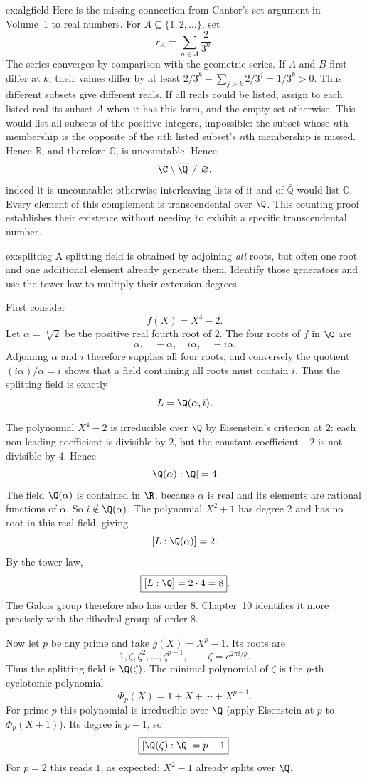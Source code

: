 \begin{solution}{ex:algfield}
Here is the missing connection from Cantor's set argument in Volume~1 to real
numbers. For $A\subseteq\{1,2,\ldots\}$, set
\[
r_A=\sum_{n\in A}\frac2{3^n}.
\]
The series converges by comparison with the geometric series. If $A$ and $B$
first differ at $k$, their values differ by at least
$2/3^k-\sum_{j>k}2/3^j=1/3^k>0$. Thus different subsets give different reals.
If all reals could be listed, assign to each listed real its subset $A$ when
it has this form, and the empty set otherwise. This would list all subsets of
the positive integers, impossible: the subset whose $n$th membership is the
opposite of the $n$th listed subset's $n$th membership is missed. Hence
$\mathbb R$, and therefore $\mathbb C$, is uncountable. Hence
\[
\C\setminus\overline{\Q}\ne\varnothing,
\]
indeed it is uncountable: otherwise interleaving lists of it and of
$\overline{\mathbb Q}$ would list $\mathbb C$. Every element of this complement is transcendental over $\Q$. This counting proof establishes their existence without needing to exhibit a specific transcendental number.
\end{solution}

\begin{solution}{ex:splitdeg}
\idea A splitting field is obtained by adjoining \emph{all} roots, but often one root and one additional element already generate them. Identify those generators and use the tower law to multiply their extension degrees.

\writeup First consider
\[
f(X)=X^4-2.
\]
Let $\alpha=\sqrt[4]{2}$ be the positive real fourth root of $2$. The four roots of $f$ in $\C$ are
\[
\alpha,\quad-\alpha,\quad i\alpha,\quad-i\alpha.
\]
Adjoining $\alpha$ and $i$ therefore supplies all four roots, and conversely the quotient $(i\alpha)/\alpha=i$ shows that a field containing all roots must contain $i$. Thus the splitting field is exactly
\[
L=\Q(\alpha,i).
\]

The polynomial $X^4-2$ is irreducible over $\Q$ by Eisenstein's criterion at $2$: each non-leading coefficient is divisible by $2$, but the constant coefficient $-2$ is not divisible by $4$. Hence
\[
[\Q(\alpha):\Q]=4.
\]
The field $\Q(\alpha)$ is contained in $\R$, because $\alpha$ is real and its elements are rational functions of $\alpha$. So $i\notin\Q(\alpha)$. The polynomial $X^2+1$ has degree $2$ and has no root in this real field, giving
\[
[L:\Q(\alpha)]=2.
\]
By the tower law,
\[
\boxed{[L:\Q]=2\cdot4=8}.
\]
The Galois group therefore also has order $8$. Chapter~10 identifies it more precisely with the dihedral group of order $8$.

Now let $p$ be any prime and take $g(X)=X^p-1$. Its roots are
\[
1,\zeta,\zeta^2,\ldots,\zeta^{p-1},
\qquad \zeta=e^{2\pi i/p}.
\]
Thus the splitting field is $\Q(\zeta)$. The minimal polynomial of $\zeta$ is the $p$-th cyclotomic polynomial
\[
\Phi_p(X)=1+X+\cdots+X^{p-1}.
\]
For prime $p$ this polynomial is irreducible over $\Q$ (apply Eisenstein at $p$ to $\Phi_p(X+1)$). Its degree is $p-1$, so
\[
\boxed{[\Q(\zeta):\Q]=p-1}.
\]
For $p=2$ this reads $1$, as expected: $X^2-1$ already splits over $\Q$.
\end{solution}

